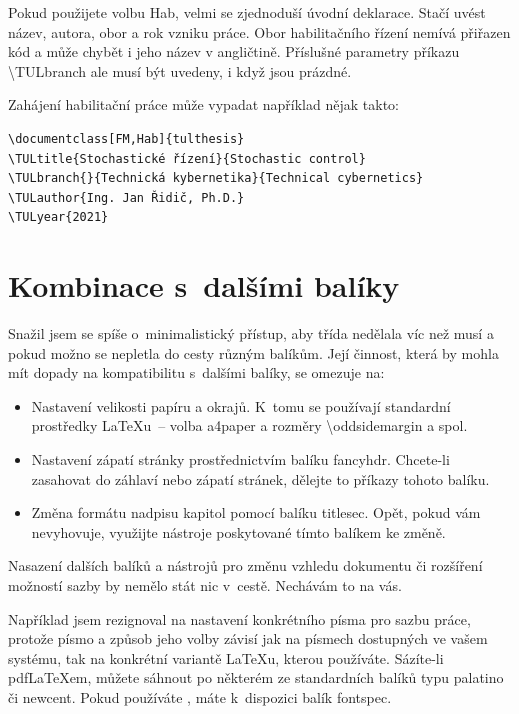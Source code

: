 \documentclass[FZS,DP,EN]{tulthesis}
\makeatletter
\newcommand{\argument}[1]{{\ttfamily\color{\tulcolor}#1}}
\newcommand{\argumentindex}[1]{\argument{#1}\index{#1}}
\newcommand{\prikazneindex}[1]{\argument{\textbackslash #1}}
\newcommand{\prikaz}[1]{\prikazneindex{#1}\index{#1@\textbackslash #1}}
\newenvironment{myquote}{\begin{list}{}{\setlength\leftmargin\parindent}\item[]}{\end{list}}
\newenvironment{listing}{\begin{myquote}\color{\tulcolor}}{\end{myquote}}
\makeatother
\begin{document}
Pokud použijete volbu \argumentindex{Hab}, velmi se zjednoduší úvodní
deklarace. Stačí uvést název, autora, obor a rok vzniku práce. Obor
habilitačního řízení nemívá přiřazen kód a může chybět i jeho název v
angličtině. Příslušné parametry příkazu \prikaz{TULbranch} ale musí být
uvedeny, i když jsou prázdné.

Zahájení habilitační práce může vypadat například nějak takto:

\begin{listing}
\begin{verbatim}
\documentclass[FM,Hab]{tulthesis}
\TULtitle{Stochastické řízení}{Stochastic control}
\TULbranch{}{Technická kybernetika}{Technical cybernetics}
\TULauthor{Ing. Jan Řidič, Ph.D.}
\TULyear{2021}
\end{verbatim}
\end{listing}


\section{Kombinace s~dalšími balíky}

Snažil jsem se spíše o~minimalistický přístup, aby třída nedělala víc než musí
a pokud možno se nepletla do cesty různým balíkům. Její činnost, která by
mohla mít dopady na kompatibilitu s~dalšími balíky, se omezuje na:

\begin{itemize}
\item Nastavení velikosti papíru a okrajů. K~tomu se používají standardní
prostředky \LaTeX u~-- volba \argument{a4paper} a rozměry
\prikazneindex{oddsidemargin} a spol.

\item Nastavení zápatí stránky prostřednictvím balíku \argument{fancyhdr}.
Chcete-li zasahovat do záhlaví nebo zápatí stránek, dělejte to příkazy tohoto
balíku.

\item Změna formátu nadpisu kapitol pomocí balíku \argument{titlesec}. Opět,
pokud vám nevyhovuje, využijte nástroje poskytované tímto balíkem ke změně.

\end{itemize}

Nasazení dalších balíků a nástrojů pro změnu vzhledu dokumentu či rozšíření
možností sazby by nemělo stát nic v~cestě. Nechávám to na vás.

Například jsem rezignoval na nastavení konkrétního písma pro sazbu práce,
protože písmo a způsob jeho volby závisí jak na písmech dostupných ve vašem
systému, tak na konkrétní variantě \LaTeX u, kterou používáte. Sázíte-li
pdf\-\LaTeX\-em, můžete sáhnout po některém ze standardních balíků typu
\argument{palatino} či \argument{newcent}. Pokud používáte \XeLaTeX, máte
k~dispozici balík \argument{fontspec}.
\end{document}
